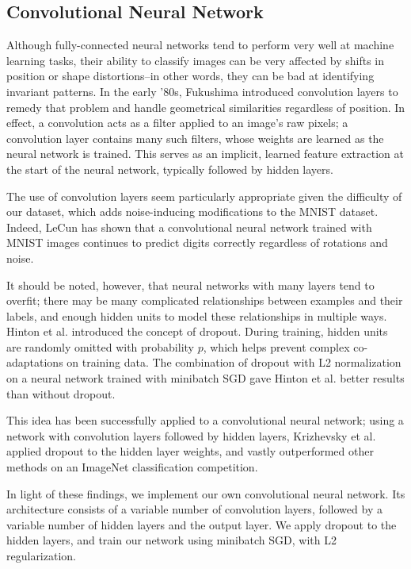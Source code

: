 \documentclass{acm_proc_article-sp}
\begin{document}
\subsection{Convolutional Neural Network}
Although fully-connected neural networks tend to perform very well at machine learning tasks, their ability to classify images can be very affected by shifts in position or shape distortions--in other words, they can be bad at identifying invariant patterns. In the early '80s, Fukushima introduced convolution layers to remedy that problem and handle geometrical similarities regardless of position.\cite{Fukushima} In effect, a convolution acts as a filter applied to an image's raw pixels; a convolution layer contains many such filters, whose weights are learned as the neural network is trained. This serves as an implicit, learned feature extraction at the start of the neural network, typically followed by hidden layers.

The use of convolution layers seem particularly appropriate given the difficulty of our dataset, which adds noise-inducing modifications to the MNIST dataset. Indeed, LeCun has shown that a convolutional neural network trained with MNIST images continues to predict digits correctly regardless of rotations and noise.\cite{LeCun}

It should be noted, however, that neural networks with many layers tend to overfit; there may be many complicated relationships between examples and their labels, and enough hidden units to model these relationships in multiple ways. Hinton et al. introduced the concept of dropout. During training, hidden units are randomly omitted with probability $p$, which helps prevent complex co-adaptations on training data. The combination of dropout with L2 normalization on a neural network trained with minibatch SGD gave Hinton et al. better results than without dropout.\cite{Hinton}  

This idea has been successfully applied to a convolutional neural network; using a network with convolution layers followed by hidden layers, Krizhevsky et al. applied dropout to the hidden layer weights, and vastly outperformed other methods on an ImageNet classification competition.\cite{Krizhevsky} 

In light of these findings, we implement our own convolutional neural network. Its architecture consists of a variable number of convolution layers, followed by a variable number of hidden layers and the output layer. We apply dropout to the hidden layers, and train our network using minibatch SGD, with L2 regularization.
\end{document}
